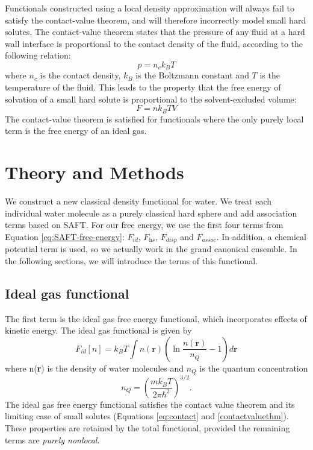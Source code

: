 \documentclass[letterpaper,twocolumn,amsmath,amssymb,prb]{revtex4-1}
\newcommand{\xx}{\textbf{r}}
\begin{document}
Functionals constructed using a local density approximation
will always fail to satisfy the contact-value theorem, and will
therefore incorrectly model small hard solutes.
The contact-value theorem states that the pressure of any fluid at a
hard wall interface is proportional to the contact density of the
fluid\cite{henderson1979exact}, according to the following relation:
\begin{equation}\label{eq:contact}
  p = n_ck_BT
\end{equation}
where $n_c$ is the contact density, $k_B$ is the Boltzmann constant
and $T$ is the temperature of
the fluid. This leads to the property that the free energy of
solvation of a small hard solute is proportional to the
solvent-excluded volume:
\begin{equation}\label{contactvaluethm}
  F = n k_BT V
\end{equation}
The contact-value theorem is satisfied for functionals where the
only purely local term is the free energy of an ideal gas.

\section{Theory and Methods}
We construct a new classical density functional for water. We treat
each individual water molecule as a purely classical hard sphere and
add association terms based on SAFT. For our free energy, we use the
first four terms from Equation \ref{eq:SAFT-free-energy}: $F_\textit{id}$,
$F_\textit{hs}$, $F_\textit{disp}$ and $F_\textit{assoc}$. In
addition, a chemical potential term is used, so we actually work in
the grand canonical ensemble.  In the following sections, we will
introduce the terms of this functional.

\subsection{Ideal gas functional}
The first term is the ideal gas free energy functional, which
incorporates effects of kinetic energy.  The ideal gas functional is
given by
\begin{equation}\label{idealgas}
  F_{id}[n] = k_B T \int n(\xx)\left( \ln{\frac{n(\xx)}{n_Q}} - 1\right) d\xx
\end{equation}
where n(\xx) is the density of water molecules and $n_Q$ is the
quantum concentration
\begin{equation}\label{quantumconcentration}
 n_Q =\left(\frac{mk_BT}{2\pi\hbar^2}\right)^{3/2}.
\end{equation}
The ideal gas free energy functional satisfies the contact value
theorem and its limiting case of small solutes (Equations
\ref{eq:contact} and \ref{contactvaluethm}). These properties are
retained by the total functional, provided the remaining terms are
\emph{purely nonlocal}.
\end{document}
